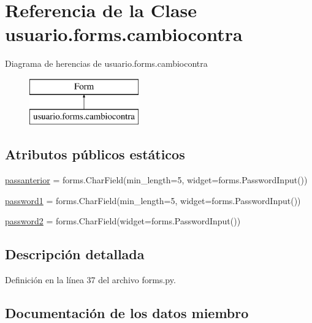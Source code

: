 \hypertarget{classusuario_1_1forms_1_1cambiocontra}{}\section{Referencia de la Clase usuario.\+forms.\+cambiocontra}
\label{classusuario_1_1forms_1_1cambiocontra}
Diagrama de herencias de usuario.\+forms.\+cambiocontra\begin{figure}[H]
\begin{center}
\leavevmode
\includegraphics[height=2.000000cm]{classusuario_1_1forms_1_1cambiocontra}
\end{center}
\end{figure}
\subsection*{Atributos públicos estáticos}
\begin{DoxyCompactItemize}
\item 
\hyperlink{classusuario_1_1forms_1_1cambiocontra_ad87c4cc32bc763f4fc67f6d583aacb10}{passanterior} = forms.\+Char\+Field(min\+\_\+length=5, widget=forms.\+Password\+Input())
\item 
\hyperlink{classusuario_1_1forms_1_1cambiocontra_a94c9c70a31c69534c05b871a0b92d574}{password1} = forms.\+Char\+Field(min\+\_\+length=5, widget=forms.\+Password\+Input())
\item 
\hyperlink{classusuario_1_1forms_1_1cambiocontra_a7bcc3d86de533f3dc7ce291b037aa791}{password2} = forms.\+Char\+Field(widget=forms.\+Password\+Input())
\end{DoxyCompactItemize}


\subsection{Descripción detallada}


Definición en la línea 37 del archivo forms.\+py.



\subsection{Documentación de los datos miembro}
